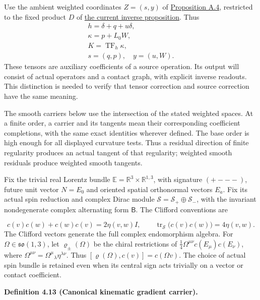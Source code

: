 \documentclass[
  english,
  11pt,
  reqno]{amsart}
\makeatletter
\newcommand{\pandocstatementheading}[1]{%
  \par\addpenalty{\@beginparpenalty}%
  \addvspace{.5\baselineskip plus .2\baselineskip minus .2\baselineskip}%
  {\normalfont\bfseries #1\par}%
  \nobreak\@afterindenttrue\@afterheading
}
\makeatother
\begin{document}
Use the ambient weighted coordinates \(Z=(s,y)\) of
\hyperref[prop:online-chart-exact-ambient-decoder]{Proposition A.4},
restricted to the fixed product \(D\) of
\hyperref[prop:online-current-inverse-horizontal-flatness]{the current
inverse proposition}. Thus \[
\begin{gathered}
h=\delta+q+u\delta, \\
\kappa=p+L_0W, \\
K=\operatorname{TF}_h\kappa, \\
s=(q,p),\quad y=(u,W).
\end{gathered}
\] These tensors are auxiliary coefficients of a source operation. Its
output will consist of actual operators and a contact graph, with
explicit inverse readouts. This distinction is needed to verify that
tensor correction and source correction have the same meaning.

The smooth carriers below use the intersection of the stated weighted
spaces. At a finite order, a carrier and its tangents mean their
corresponding coefficient completions, with the same exact identities
wherever defined. The base order is high enough for all displayed
curvature tests. Thus a residual direction of finite regularity produces
an actual tangent of that regularity; weighted smooth residuals produce
weighted smooth tangents.

Fix the trivial real Lorentz bundle
\(\mathbb E=\mathbb R^3\times\mathbb R^{1,3}\), with signature
\((+---)\), future unit vector \(N=E_0\) and oriented spatial
orthonormal vectors \(E_a\). Fix its actual spin reduction and complex
Dirac module \(\mathscr S=\mathscr S_+\oplus\mathscr S_-\), with the
invariant nondegenerate complex alternating form \(\mathsf B\). The
Clifford conventions are

\label{eq:online-source-clifford-marking} \[
c(v)c(w)+c(w)c(v)=2\eta(v,w)I,
\qquad
\operatorname{tr}_{\mathscr S}\bigl(c(v)c(w)\bigr)=4\eta(v,w).
\] The Clifford vectors generate the full complex endomorphism algebra.
For \(\Omega\in\mathfrak{so}(1,3)\), let \(\varrho_\pm(\Omega)\) be the
chiral restrictions of \(\frac14\Omega^{\mu\nu}c(E_\mu)c(E_\nu)\), where
\(\Omega^{\mu\nu}=\Omega^\mu{}_{\lambda}\eta^{\lambda\nu}\). Thus
\([\varrho(\Omega),c(v)]=c(\Omega v)\). The choice of actual spin bundle
is retained even when its central sign acts trivially on a vector or
contact coefficient.

\pandocstatementheading{\leavevmode{}\label{def:online-kinematic-gradient-carrier}Definition 4.13 (Canonical kinematic gradient carrier).}
\end{document}
